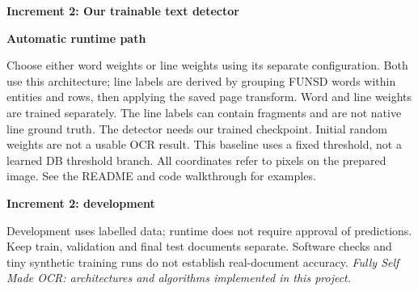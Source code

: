 \documentclass[11pt,a4paper]{article}
\begin{document}
\begin{center}\LARGE\bfseries Increment 2: Our trainable text detector\end{center}
\textbf{Automatic runtime path}
\begin{center}\end{center}
Choose either word weights or line weights using its separate configuration.
Both use this architecture; line labels are derived by grouping FUNSD words within
entities and rows, then applying the saved page transform. Word and line weights
are trained separately. The line labels can contain fragments and are not native
line ground truth.
The detector needs our trained checkpoint. Initial random weights are not a usable OCR result. This baseline uses a fixed threshold, not a learned DB threshold branch.
All coordinates refer to pixels on the prepared image. See the README and code walkthrough for examples.
\newpage
\begin{center}\LARGE\bfseries Increment 2: development\end{center}
\begin{center}\end{center}
Development uses labelled data; runtime does not require approval of predictions. Keep train, validation and final test documents separate.
Software checks and tiny synthetic training runs do not establish real-document accuracy.
\vfill\textit{Fully Self Made OCR: architectures and algorithms implemented in this project.}
\end{document}
